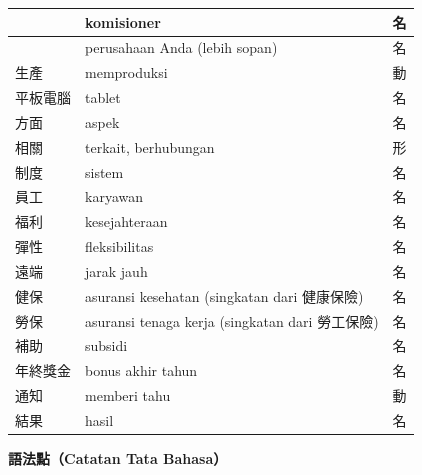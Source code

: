 \documentclass[a4paper,12pt]{ctexart}
\newcommand{\vocabnohi}[1]{{\fontsize{14pt}{16pt}\selectfont\hanwangfont #1}}
\begin{document}
\begin{longtable}{|>{\centering\arraybackslash}p{3.5cm}|p{8.5cm}|>{\centering\arraybackslash}p{1.5cm}|}
\hline
\vocabnohi{專員} & komisioner & {\footnotesize 名} \\
\hline
\vocabnohi{貴公司} & perusahaan Anda (lebih sopan) & {\footnotesize 名} \\
\hline
\vocabnohi{生產} & memproduksi & {\footnotesize 動} \\
\hline
\vocabnohi{平板電腦} & tablet & {\footnotesize 名} \\
\hline
\vocabnohi{方面} & aspek & {\footnotesize 名} \\
\hline
\vocabnohi{相關} & terkait, berhubungan & {\footnotesize 形} \\
\hline
\vocabnohi{制度} & sistem & {\footnotesize 名} \\
\hline
\vocabnohi{員工} & karyawan & {\footnotesize 名} \\
\hline
\vocabnohi{福利} & kesejahteraan & {\footnotesize 名} \\
\hline
\vocabnohi{彈性} & fleksibilitas & {\footnotesize 名} \\
\hline
\vocabnohi{遠端} & jarak jauh & {\footnotesize 名} \\
\hline
\vocabnohi{健保} & asuransi kesehatan (singkatan dari \vocabnohi{健康保險}) & {\footnotesize 名} \\
\hline
\vocabnohi{勞保} & asuransi tenaga kerja (singkatan dari \vocabnohi{勞工保險}) & {\footnotesize 名} \\
\hline
\vocabnohi{補助} & subsidi & {\footnotesize 名} \\
\hline
\vocabnohi{年終獎金} & bonus akhir tahun & {\footnotesize 名} \\
\hline
\vocabnohi{通知} & memberi tahu & {\footnotesize 動} \\
\hline
\vocabnohi{結果} & hasil & {\footnotesize 名} \\
\hline
\end{longtable}

\vspace{0.5cm}
\begin{center}
{\Large\bfseries 語法點（Catatan Tata Bahasa）}
\end{center}
\end{document}
